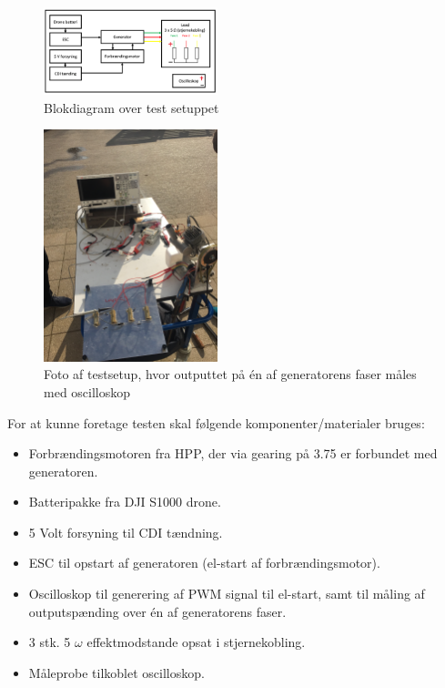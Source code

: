 \begin{figure}[h]
  \centering
  \includegraphics[width=0.45\textwidth]{blokdia.png}
  \caption{Blokdiagram over test setuppet}
  \label{fig:testsetup2}
\end{figure}


\begin{figure}[h]
  \centering
  \includegraphics[width=0.45\textwidth]{testsetup.JPG}
  \caption{Foto af testsetup, hvor outputtet på én af generatorens faser måles med oscilloskop}
  \label{fig:testsetup}
\end{figure}


For at kunne foretage testen skal følgende komponenter/materialer bruges:
\begin{itemize}
\item Forbrændingsmotoren fra HPP, der via gearing på 3.75 er forbundet med generatoren.
\item Batteripakke fra DJI S1000 drone.
\item 5 Volt forsyning til CDI tændning.
\item ESC til opstart af generatoren (el-start af forbrændingsmotor).
\item Oscilloskop til generering af PWM signal til el-start, samt til måling af outputspænding over én af generatorens faser.
\item 3 stk. 5 $\omega$ effektmodstande opsat i stjernekobling.
\item Måleprobe tilkoblet oscilloskop.
\end{itemize}

